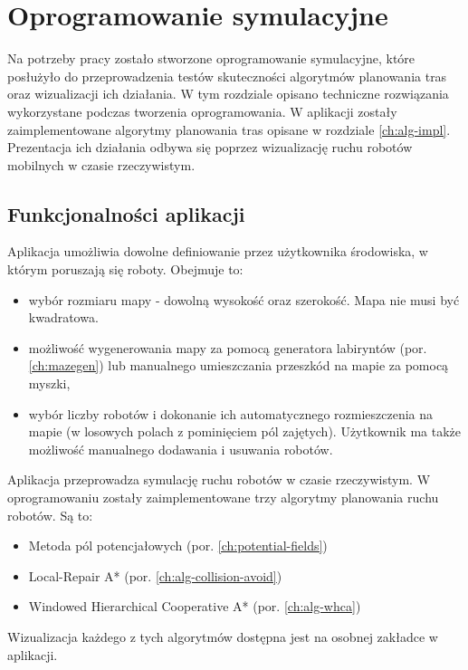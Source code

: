 \chapter{Oprogramowanie symulacyjne}
\label{ch:simulation-app}

Na potrzeby pracy zostało stworzone oprogramowanie symulacyjne, które posłużyło do przeprowadzenia testów skuteczności algorytmów planowania tras oraz wizualizacji ich działania.
W tym rozdziale opisano techniczne rozwiązania wykorzystane podczas tworzenia oprogramowania.
W aplikacji zostały zaimplementowane algorytmy planowania tras opisane w rozdziale \ref{ch:alg-impl}.
Prezentacja ich działania odbywa się poprzez wizualizację ruchu robotów mobilnych w czasie rzeczywistym. 

\section{Funkcjonalności aplikacji}
Aplikacja umożliwia dowolne definiowanie przez użytkownika środowiska, w którym poruszają się roboty. Obejmuje to:
\begin{itemize}
	\item wybór rozmiaru mapy - dowolną wysokość oraz szerokość. Mapa nie musi być kwadratowa.
	\item możliwość wygenerowania mapy za pomocą generatora labiryntów (por. \ref{ch:mazegen}) lub manualnego umieszczania przeszkód na mapie za pomocą myszki,
	\item wybór liczby robotów i dokonanie ich automatycznego rozmieszczenia na mapie (w losowych polach z pominięciem pól zajętych). Użytkownik ma także możliwość manualnego dodawania i usuwania robotów.
\end{itemize}

Aplikacja przeprowadza symulację ruchu robotów w czasie rzeczywistym. W oprogramowaniu zostały zaimplementowane trzy algorytmy planowania ruchu robotów. Są to:
\begin{itemize}
	\item Metoda pól potencjałowych (por. \ref{ch:potential-fields})
	\item Local-Repair A* (por. \ref{ch:alg-collision-avoid})
	\item Windowed Hierarchical Cooperative A* (por. \ref{ch:alg-whca})
\end{itemize}
Wizualizacja każdego z tych algorytmów dostępna jest na osobnej zakładce w aplikacji.
